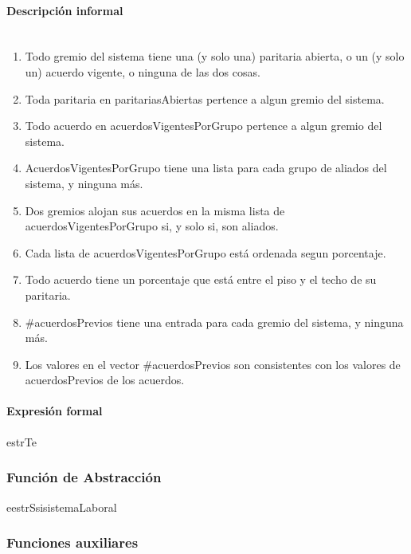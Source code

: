 \paragraph{Descripción informal \\ \\}
\begin{enumerate}

	\item Todo gremio del sistema tiene una (y solo una) paritaria abierta, o un (y solo un) acuerdo vigente, o ninguna de las dos cosas.
	\item Toda paritaria en paritariasAbiertas pertence a algun gremio del sistema.
	\item Todo acuerdo en acuerdosVigentesPorGrupo pertence a algun gremio del sistema.
	\item AcuerdosVigentesPorGrupo tiene una lista para cada grupo de aliados del sistema, y ninguna más.
	\item Dos gremios alojan sus acuerdos en la misma lista de acuerdosVigentesPorGrupo si, y solo si, son aliados.
	\item Cada lista de acuerdosVigentesPorGrupo está ordenada segun porcentaje.
	\item Todo acuerdo tiene un porcentaje que está entre el piso y el techo de su paritaria.
	\item \#acuerdosPrevios tiene una entrada para cada gremio del sistema, y ninguna más.
	\item Los valores en el vector \#acuerdosPrevios son consistentes con los valores de acuerdosPrevios de los acuerdos.

\end{enumerate}

\paragraph{Expresión formal \\}
\begin{RepFormal}{estrT}{e}
\end{RepFormal}

\subsubsection{Funci\'on de Abstracci\'on}

\begin{FunAbsDescriptiva}{e}{estrS}{si}{sistemaLaboral}


\end{FunAbsDescriptiva}

\subsubsection{Funciones auxiliares}
